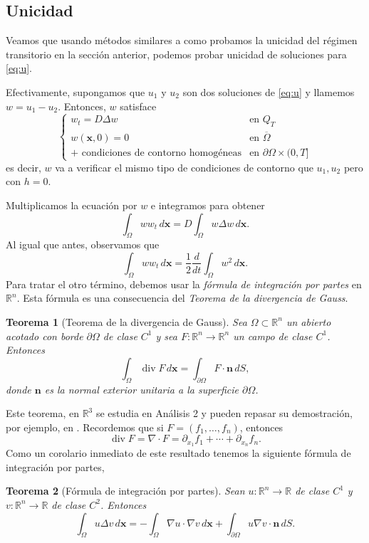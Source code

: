 \documentclass[12pt, a4paper]{amsbook}
\def\div{\operatorname {\mathrm{div}}}
\newcommand{\R}{{\mathbb R}}
\newcommand{\n}{{\mathbf n}}
\newcommand{\xx}{{\mathbf x}}
\newtheorem{teo}{Teorema}[section]
\theoremstyle{remark}
\theoremstyle{definition}
\numberwithin{section}{chapter}
\numberwithin{subsection}{section}
\numberwithin{equation}{section}
\numberwithin{figure}{chapter}
\begin{document}
\subsection{Unicidad}\label{sec:unicidad}
Veamos que usando métodos similares a como probamos la unicidad del régimen transitorio en la sección anterior, podemos probar unicidad de soluciones para \eqref{eq:u}.

Efectivamente, supongamos que $u_1$ y $u_2$ son dos soluciones de \eqref{eq:u} y llamemos $w=u_1-u_2$. Entonces, $w$ satisface
\begin{equation}\label{eq:w}
\begin{cases}
w_t = D\Delta w & \text{en } Q_T\\
w(\xx, 0) = 0 & \text{en } \overline{\Omega}\\
\text{+ condiciones de contorno homogéneas} & \text{en } \partial\Omega\times(0,T]
\end{cases}
\end{equation}
es decir, $w$ va a verificar el mismo tipo de condiciones de contorno que $u_1, u_2$ pero con $h=0$.

Multiplicamos la ecuación por $w$ e integramos para obtener
\begin{equation}\label{test.w}
\int_\Omega w w_t\, d\xx = D\int_\Omega w \Delta w\, d\xx.
\end{equation}
Al igual que antes, observamos que
$$
\int_\Omega w w_t\, d\xx = \frac12\frac{d}{dt}\int_\Omega w^2\, d\xx.
$$
Para tratar el otro término, debemos usar la {\em fórmula de integración por partes} en $\R^n$. Esta fórmula es una consecuencia del {\em Teorema de la divergencia de Gauss}.
\begin{teo}[Teorema de la divergencia de Gauss]\label{Gauss}
Sea $\Omega\subset\R^n$ un abierto acotado con borde $\partial\Omega$ de clase $C^1$ y sea $F\colon \R^n \to\R^n$ un campo de clase $C^1$. Entonces
$$
\int_\Omega \div F\, d\xx = \int_{\partial\Omega} F\cdot\n\, dS,
$$
donde $\n$ es la normal exterior unitaria a la superficie $\partial\Omega$.
\end{teo}
Este teorema, en $\R^3$ se estudia en Análisis 2 y pueden repasar su demostración, por ejemplo, en \cite{Tromba}. Recordemos que si $F = (f_1,\dots,f_n)$, entonces
$$
\div F = \nabla \cdot F = \partial_{x_1}f_1 + \cdots + \partial_{x_n} f_n.
$$
Como un corolario inmediato de este resultado tenemos la siguiente fórmula de integración por partes,
\begin{teo}[Fórmula de integración por partes]\label{partes}
Sean $u\colon \R^n\to\R$  de clase $C^1$ y $v\colon \R^n\to\R$ de clase $C^2$. Entonces
$$
\int_\Omega u\Delta v\, d\xx = -\int_\Omega \nabla u\cdot\nabla v\, d\xx + \int_{\partial\Omega} u \nabla v\cdot\n\, dS.
$$
\end{teo}
\end{document}
